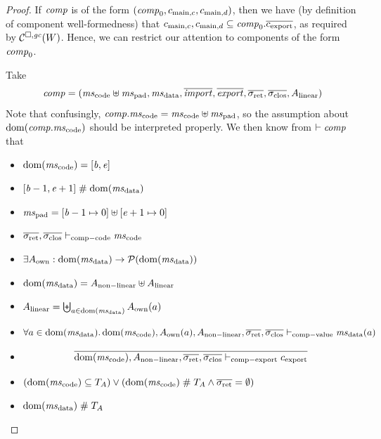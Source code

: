 \documentclass[a4paper]{article}
\begin{document}
\begin{proof}
  If $\mathit{comp}$ is of the form $(\mathit{comp}_0,c_{\mathrm{main},c}, c_{\mathrm{main},d})$, then we have (by definition of component well-formedness) that $c_{\mathrm{main},c}, c_{\mathrm{main},d} \subseteq \mathit{comp}_0.\overline{c_{\mathrm{export}}}$, as required by $\mathcal{C}^{\square,\mathit{gc}}(W)$.
  Hence, we can restrict our attention to components of the form $\mathit{comp}_0$.

  Take
  \begin{equation*}
    \var{comp} = (\mscode\uplus\mspad,\msdata,\overline{\var{import}},\overline{\var{export}},\sigrets,\sigcloss,A_\linear)
  \end{equation*}
  Note that confusingly, $\var{comp}.\mscode = \mscode\uplus\mspad$, so the assumption about $\dom(\var{comp}.\mscode)$ should be interpreted properly.
  We then know from $\vdash \mathit{comp}$ that 
  \begin{itemize}
  \item $\dom(\mscode) = [\baddr,\eaddr]$
  \item $[\baddr-1,\eaddr+1] \mathrel{\#} \dom(\msdata)$
  \item $\mspad = [\baddr-1\mapsto 0] \uplus [\eaddr+1 \mapsto 0]$
  \item $\sigrets,\sigcloss \vdash_{\mathrm{comp-code}} \mscode$
  \item $\exists A_\mathrm{own} : \dom(\msdata) \rightarrow \powerset{\dom(\msdata)}$
  \item $\dom(\msdata) = A_{\mathrm{non-linear}} \uplus A_\linear$
  \item $A_\linear = \biguplus_{a \in \dom(\msdata)} A_{\mathrm{own}}(a)$
  \item
    \begin{equation*}
      \forall a \in \dom(\msdata)\ldotp \dom(\mscode),A_{\mathrm{own}}(a),A_{\mathrm{non-linear}},\sigrets,\sigcloss \vdash_{\mathrm{comp-value}} \msdata(a)
    \end{equation*}
  \item
    \begin{equation*}
      \overline{\dom(\mscode), A_{\mathrm{non-linear}}, \sigrets,\sigcloss \vdash_{\mathrm{comp-export}} c_{\mathrm{export}}}
    \end{equation*}
  \item $(\dom(\mscode) \subseteq \ta) \vee (\dom(\mscode) \mathrel{\#} \ta \wedge \sigrets = \emptyset)$
  \item $\dom(\msdata) \mathrel{\#} \ta$
  \end{itemize}


\end{proof}
\end{document}
